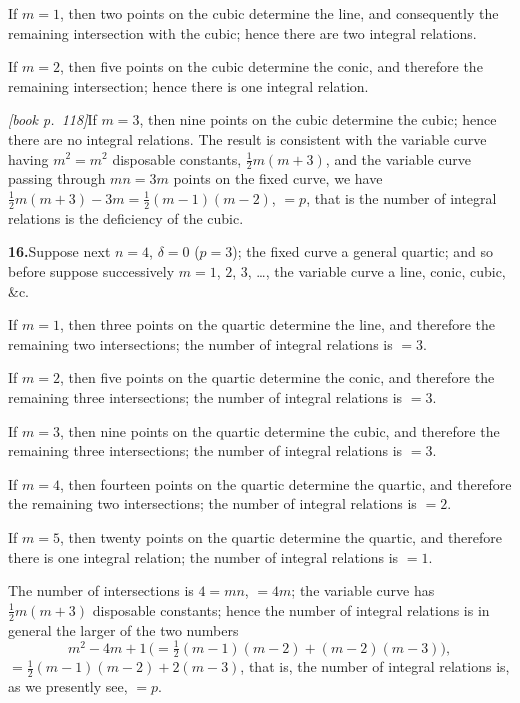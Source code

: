 \documentclass[11pt,a4paper]{article}
\theoremstyle{plain}
\theoremstyle{definition}
\theoremstyle{remark}
\begin{document}
If $m = 1$, then two points on the cubic determine the line, and consequently the remaining intersection with the cubic; hence there are two integral relations.

If $m = 2$, then five points on the cubic determine the conic, and therefore the remaining intersection; hence there is one integral relation.

\noindent\textit{[book p.~118]}\quad If $m = 3$, then nine points on the cubic determine the cubic; hence there are no integral relations. The result is consistent with the variable curve having $m^2 = m^2$ disposable constants, $\tfrac{1}{2}m(m + 3)$, and the variable curve passing through $mn = 3m$ points on the fixed curve, we have $\tfrac{1}{2}m(m + 3) - 3m = \tfrac{1}{2}(m - 1)(m - 2)$, $= p$, that is the number of integral relations is the deficiency of the cubic.

\medskip\noindent\textbf{16.}\quad Suppose next $n = 4$, $\delta = 0$ ($p = 3$); the fixed curve a general quartic; and so before suppose successively $m = 1$, $2$, $3$, \ldots, the variable curve a line, conic, cubic, \&c.

If $m = 1$, then three points on the quartic determine the line, and therefore the remaining two intersections; the number of integral relations is $= 3$.

If $m = 2$, then five points on the quartic determine the conic, and therefore the remaining three intersections; the number of integral relations is $= 3$.

If $m = 3$, then nine points on the quartic determine the cubic, and therefore the remaining three intersections; the number of integral relations is $= 3$.

If $m = 4$, then fourteen points on the quartic determine the quartic, and therefore the remaining two intersections; the number of integral relations is $= 2$.

If $m = 5$, then twenty points on the quartic determine the quartic, and therefore there is one integral relation; the number of integral relations is $= 1$.

The number of intersections is $4 = mn$, $= 4m$; the variable curve has $\tfrac{1}{2}m(m + 3)$ disposable constants; hence the number of integral relations is in general the larger of the two numbers
\[
m^2 - 4m + 1\,\bigl(= \tfrac{1}{2}(m - 1)(m - 2) + (m - 2)(m - 3)\bigr),
\]
$= \tfrac{1}{2}(m - 1)(m - 2) + 2 (m - 3)$, that is, the number of integral relations is, as we presently see, $= p$.
\end{document}
